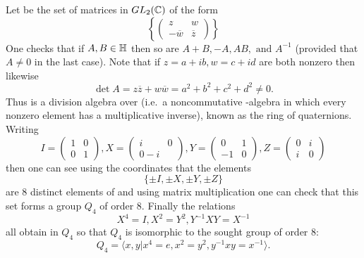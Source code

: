 \begin{eg}
    Let \HH{} be the set of matrices in $GL_2(\mathbb{C})$ of the form \[\left\{
    \begin{pmatrix}
        z & w \\ -\overline{w} & \overline{z}
    \end{pmatrix}
    \right\} \] One checks that if $A,B\in \mathbb{H}$ then so are $A+B, -A, AB,
    \text{ and } A^{-1}$ (provided that $A\neq 0$ in the last case). Note that
    if $z = a+ib, w =c+id$ are both nonzero then likewise \[\det A =
    z\overline{z} + w\overline{w} = a^2 + b^2 + c^2 + d^2 \neq 0.\] Thus \HH{}
    is a division algebra over \R{} (i.e.~a noncommutative \R-algebra in which
    every nonzero element has a multiplicative inverse), known as the ring of
    quaternions. Writing
    \[I = \begin{pmatrix} 1 & 0 \\ 0 & 1 \end{pmatrix},
    X = \begin{pmatrix} i & 0 \\ 0 -i \end{pmatrix},
    Y = \begin{pmatrix} 0 & 1 \\ -1 & 0 \end{pmatrix},
    Z = \begin{pmatrix} 0 & i \\ i & 0 \end{pmatrix}
    \] then one can see using the coordinates that the elements \[\{\pm I, \pm
    X, \pm Y, \pm Z\}\] are 8 distinct elements of \HH{} and using matrix
    multiplication one can check that this set forms a group $Q_4$ of order 8.
    Finally the relations \[X^4 = I, X^2 = Y^2, Y^{-1}XY = X^{-1}\] all obtain
    in $Q_4$ so that $Q_4$ is isomorphic to the sought group of order 8: \[Q_4
    = \langle x,y | x^4 = e, x^2 = y^2, y^{-1}xy = x^{-1}\rangle.\]
\end{eg}

